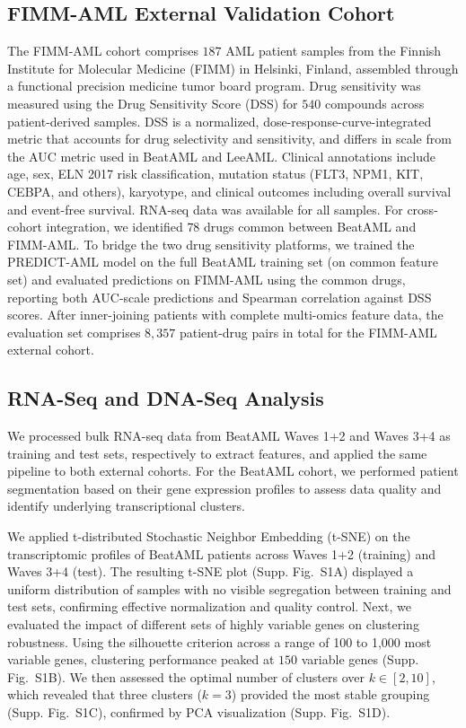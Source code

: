 \documentclass[pdflatex,sn-mathphys-num]{sn-jnl}
\theoremstyle{thmstyleone}
\theoremstyle{thmstyletwo}
\theoremstyle{thmstylethree}
\begin{document}
\subsection{FIMM-AML External Validation Cohort}\label{sec2.3}
The FIMM-AML cohort \cite{malani2022implementing} comprises $187$ AML patient samples from the Finnish Institute for Molecular Medicine (FIMM) in Helsinki, Finland, assembled through a functional precision medicine tumor board program. Drug sensitivity was measured using the Drug Sensitivity Score (DSS) \cite{malani2022implementing} for $540$ compounds across patient-derived samples. DSS is a normalized, dose-response-curve-integrated metric that accounts for drug selectivity and sensitivity, and differs in scale from the AUC metric used in BeatAML and LeeAML. Clinical annotations include age, sex, ELN 2017 risk classification, mutation status (FLT3, NPM1, KIT, CEBPA, and others), karyotype, and clinical outcomes including overall survival and event-free survival. RNA-seq data was available for all samples. For cross-cohort integration, we identified $78$ drugs common between BeatAML and FIMM-AML. To bridge the two drug sensitivity platforms, we trained the PREDICT-AML model on the full BeatAML training set (on common feature set) and evaluated predictions on FIMM-AML using the common drugs, reporting both AUC-scale predictions and Spearman correlation against DSS scores. After inner-joining patients with complete multi-omics feature data, the evaluation set comprises $8{,}357$ patient-drug pairs in total for the FIMM-AML external cohort.

\subsection{RNA-Seq and DNA-Seq Analysis}\label{sec2.4}
We processed bulk RNA-seq data from BeatAML Waves 1+2 and Waves 3+4 as training and test sets, respectively to extract features, and applied the same pipeline to both external cohorts. For the BeatAML cohort, we performed patient segmentation based on their gene expression profiles to assess data quality and identify underlying transcriptional clusters.

We applied t-distributed Stochastic Neighbor Embedding (t-SNE) \cite{van2008visualizing} on the transcriptomic profiles of BeatAML patients across Waves 1+2 (training) and Waves 3+4 (test). The resulting t-SNE plot (Supp. Fig.~S1A) displayed a uniform distribution of samples with no visible segregation between training and test sets, confirming effective normalization and quality control. Next, we evaluated the impact of different sets of highly variable genes on clustering robustness. Using the silhouette criterion \cite{rousseeuw1987silhouettes} across a range of 100 to 1,000 most variable genes, clustering performance peaked at $150$ variable genes (Supp. Fig.~S1B). We then assessed the optimal number of clusters over $k \in [2, 10]$, which revealed that three clusters ($k=3$) provided the most stable grouping (Supp. Fig.~S1C), confirmed by PCA visualization (Supp. Fig.~S1D).
\end{document}
